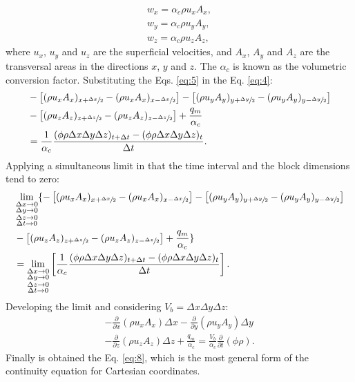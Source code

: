 	\begin{align}
	\label{eq:5} \nonumber
	w_x= \alpha_c \rho u_x A_x, \\ \nonumber
	w_y= \alpha_c \rho u_y A_y,  \\
	w_z= \alpha_c \rho u_z A_z,
	\end{align}
where $u_x$, $u_y$ and $u_z$  are the superficial velocities, and  $A_x$, $A_y$ and $A_z$ are the transversal areas in the directions $x$, $y$ and $z$. The $\alpha_c$ is known as the volumetric conversion factor. Substituting the Eqs. \ref{eq:5} in the Eq. \ref{eq:4}:
 	\begin{align}\nonumber
	\label{eq:6}
	& -\left[(\rho u_x A_x)_{x+\sfrac{\Delta x}{2}}-(\rho u_x A_x)_{x-\sfrac{\Delta x}{2}} \right]
	-\left[(\rho u_y A_y)_{y+\sfrac{\Delta y}{2}}-(\rho u_y A_y)_{y-\sfrac{\Delta y}{2}}\right] \\ \nonumber
	& -\left[(\rho u_z A_z)_{z+\sfrac{\Delta z}{2}}-(\rho u_z A_z)_{z-\sfrac{\Delta z}{2}}\right]
	+ \frac{q_m}{\alpha_c} \\
	& = \frac{1}{\alpha_c}\frac{(\phi \rho \Delta x \Delta y \Delta z)_{t+\Delta t}-(\phi \rho \Delta x \Delta y \Delta z)_{t}}{\Delta t} .
	\end{align}
Applying a simultaneous limit in that the time interval and the block dimensions tend to zero:
 	\begin{align}\nonumber
	\label{eq:7}
	& \lim_{\substack{\Delta x \to 0 \\ \Delta y \to 0 \\ \Delta z \to 0 \\ \Delta t \to 0}} \{
	-\left[(\rho u_x A_x)_{x+\sfrac{\Delta x}{2}}-(\rho u_x A_x)_{x-\sfrac{\Delta x}{2}} \right]
	-\left[(\rho u_y A_y)_{y+\sfrac{\Delta y}{2}}-(\rho u_y A_y)_{y-\sfrac{\Delta y}{2}}\right] \\ \nonumber
	& - \left[(\rho u_z A_z)_{z+\sfrac{\Delta z}{2}}-(\rho 	u_z A_z)_{z-\sfrac{\Delta z}{2}}\right]
	+ \frac{q_m}{\alpha_c} \} \\
	& = \lim_{\substack{\Delta x \to 0 \\ \Delta y \to 0 \\ \Delta z \to 0 \\ \Delta t \to 0}} \left[\frac{1}{\alpha_c}\frac{(\phi \rho \Delta x \Delta y \Delta z)_{t+\Delta t}-(\phi \rho \Delta x \Delta y \Delta z)_{t}}{\Delta t}\right] .
	\end{align}
Developing the limit and considering $V_b=\Delta x \Delta y \Delta z$:
	\begin{multline}
	\label{eq:8}
	-\frac{\partial}{\partial x}(\rho u_x A_x)\Delta x - \frac{\partial}{\partial y}(\rho u_y A_y)\Delta y \\
	- \frac{\partial}{\partial z}(\rho u_z A_z)\Delta z + \frac {q_m}{\alpha_c} = \frac {V_b}{\alpha_c}\frac{\partial}{\partial t}(\phi \rho).
	\end{multline}
Finally is obtained the Eq. \ref{eq:8}, which is the most general form of the continuity equation for Cartesian coordinates.
